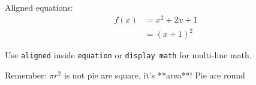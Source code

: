\documentclass[11pt]{article}
\begin{document}
\begin{examplebox}
Aligned equations:
\[
\begin{aligned}
f(x) &= x^2 + 2x + 1 \\
     &= (x+1)^2
\end{aligned}
\]
\end{examplebox}

\begin{keynotebox}
Use \texttt{aligned} inside \texttt{equation} or \texttt{display math} for multi-line math.
\end{keynotebox}

\begin{funbox}
Remember: $\pi r^2$ is not pie are square, it's **area**!  
Pie are round 🤡
\end{funbox}
\end{document}
